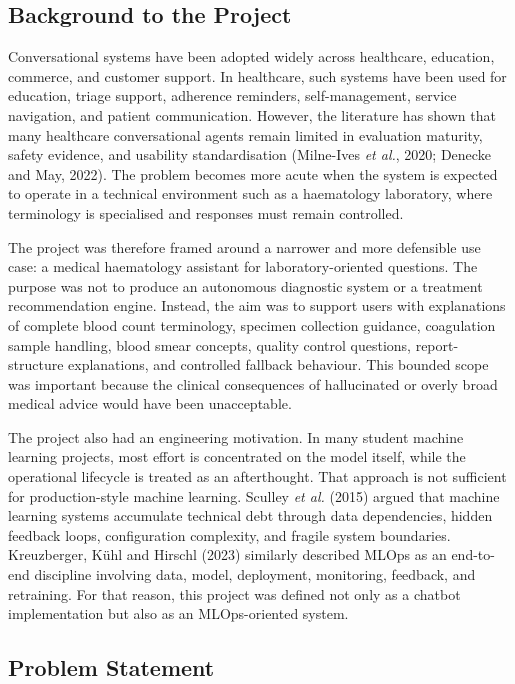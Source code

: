 \subsection{Background to the Project}

Conversational systems have been adopted widely across healthcare, education, commerce, and customer support. In healthcare, such systems have been used for education, triage support, adherence reminders, self-management, service navigation, and patient communication. However, the literature has shown that many healthcare conversational agents remain limited in evaluation maturity, safety evidence, and usability standardisation (Milne-Ives \textit{et al.}, 2020; Denecke and May, 2022). The problem becomes more acute when the system is expected to operate in a technical environment such as a haematology laboratory, where terminology is specialised and responses must remain controlled.

The project was therefore framed around a narrower and more defensible use case: a medical haematology assistant for laboratory-oriented questions. The purpose was not to produce an autonomous diagnostic system or a treatment recommendation engine. Instead, the aim was to support users with explanations of complete blood count terminology, specimen collection guidance, coagulation sample handling, blood smear concepts, quality control questions, report-structure explanations, and controlled fallback behaviour. This bounded scope was important because the clinical consequences of hallucinated or overly broad medical advice would have been unacceptable.

The project also had an engineering motivation. In many student machine learning projects, most effort is concentrated on the model itself, while the operational lifecycle is treated as an afterthought. That approach is not sufficient for production-style machine learning. Sculley \textit{et al.} (2015) argued that machine learning systems accumulate technical debt through data dependencies, hidden feedback loops, configuration complexity, and fragile system boundaries. Kreuzberger, Kühl and Hirschl (2023) similarly described MLOps as an end-to-end discipline involving data, model, deployment, monitoring, feedback, and retraining. For that reason, this project was defined not only as a chatbot implementation but also as an MLOps-oriented system.

\subsection{Problem Statement}

